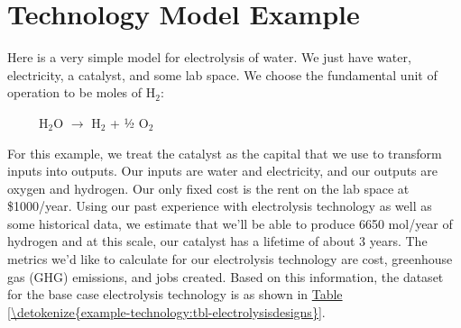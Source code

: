 \documentclass[letterpaper,10pt,english]{sphinxmanual}
\begin{document}
\chapter{Technology Model Example}
\label{\detokenize{example-technology:technology-model-example}}\label{\detokenize{example-technology:sec-techmodelexample}}\label{\detokenize{example-technology::doc}}
Here is a very simple model for electrolysis of water. We just have water, electricity, a catalyst, and some lab space. We choose the fundamental unit of operation to be moles of H$_{\text{2}}$:

     H$_{\text{2}}$O \(\rightarrow\) H$_{\text{2}}$ + ½ O$_{\text{2}}$

For this example, we treat the catalyst as the capital that we use to transform inputs into outputs. Our inputs are water and electricity, and our outputs are oxygen and hydrogen. Our only fixed cost is the rent on the lab space at \$1000/year. Using our past experience with electrolysis technology as well as some historical data, we estimate that we’ll be able to produce 6650 mol/year of hydrogen and at this scale, our catalyst has a lifetime of about 3 years. The metrics we’d like to calculate for our electrolysis technology are cost, greenhouse gas (GHG) emissions, and jobs created. Based on this information, the  dataset for the base case electrolysis technology is as shown in \hyperref[\detokenize{example-technology:tbl-electrolysisdesigns}]{Table \ref{\detokenize{example-technology:tbl-electrolysisdesigns}}}.
\end{document}
